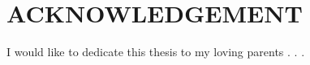 \chapter*{\centering\normalsize ACKNOWLEDGEMENT}

\begin{center}
I would like to dedicate this thesis to my loving parents . . .
\end{center}